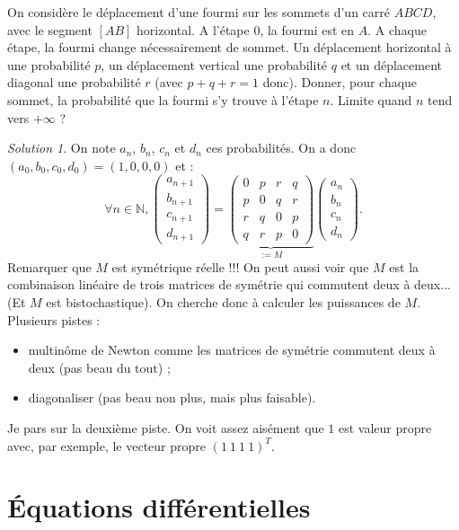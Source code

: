 \documentclass[french]{book}
\newcommand{\N}{\mathbb{N}}
\theoremstyle{definition}
\theoremstyle{remark}
\newtheorem*{sol}{Solution}
\begin{document}
\begin{exo}[2]{}
	On considère le déplacement d'une fourmi sur les sommets d'un carré $ABCD$, avec le segment $[AB]$ horizontal. A l'étape $0$, la fourmi est en $A$. A chaque étape, la fourmi change nécessairement de sommet. Un déplacement horizontal à une probabilité $p$, un déplacement vertical une probabilité $q$ et un déplacement diagonal une probabilité $r$ (avec $p+q+r=1$ donc). Donner, pour chaque sommet, la probabilité que la fourmi s'y trouve à l'étape $n$. Limite quand $n$ tend vers $+\infty$ ?
\end{exo}
\begin{sol}
	On note $a_n$, $b_n$, $c_n$ et $d_n$ ces probabilités. On a donc $(a_0,b_0,c_0,d_0)=(1,0,0,0)$ et :
	$$\forall n\in\N, \begin{pmatrix}
		a_{n+1}\\
		b_{n+1}\\
		c_{n+1}\\
		d_{n+1}
	\end{pmatrix}=\underbrace{\begin{pmatrix}
		0&p&r&q\\
		p&0&q&r\\
		r&q&0&p\\
		q&r&p&0
	\end{pmatrix}}_{:=M}\begin{pmatrix}
		a_n\\
		b_n\\
		c_n\\
		d_n
	\end{pmatrix}.$$
	Remarquer que $M$ est symétrique réelle !!! On peut aussi voir que $M$ est la combinaison linéaire de trois matrices de symétrie qui commutent deux à deux... (Et $M$ est bistochastique). On cherche donc à calculer les puissances de $M$. Plusieurs pistes :
	\begin{itemize}
		\item multinôme de Newton comme les matrices de symétrie commutent deux à deux (pas beau du tout) ;
		\item diagonaliser (pas beau non plus, mais plus faisable).
	\end{itemize}
	Je pars sur la deuxième piste. On voit assez aisément que $1$ est valeur propre avec, par exemple, le vecteur propre $(1\ 1\ 1\ 1)^T$.
\end{sol}

\chapter{Équations différentielles}
\end{document}
